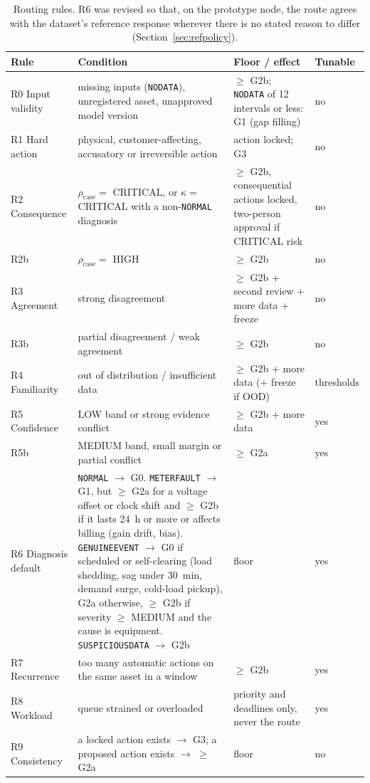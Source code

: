 \documentclass[11pt,a4paper]{article}
\renewcommand{\_}{\textunderscore\allowbreak}
\providecommand{\GE}{\texttt{GENUINE\_EVENT}}
\providecommand{\MF}{\texttt{METER\_FAULT}}
\providecommand{\SD}{\texttt{SUSPICIOUS\_DATA}}
\providecommand{\ND}{\texttt{NO\_DATA}}
\providecommand{\NORM}{\texttt{NORMAL}}
\newcommand{\lvl}[1]{\textsf{#1}}
\begin{document}
\begin{table}[H]
\centering\small
\footnotesize
\begin{tabularx}{\textwidth}{@{}>{\raggedright\arraybackslash}p{1.9cm}LL>{\raggedright\arraybackslash}p{1.5cm}@{}}
\toprule
\textbf{Rule} & \textbf{Condition} & \textbf{Floor / effect} & \textbf{Tunable} \\
\midrule
R0 Input validity & missing inputs (\ND), unregistered asset, unapproved model version & $\ge$ \lvl{G2b}; \ND{} of 12 intervals or less: \lvl{G1} (gap filling) & no \\
R1 Hard action & physical, customer-affecting, accusatory or irreversible action & action locked; \lvl{G3} & no \\
R2 Consequence & $\rho_{\mathrm{case}}=$ CRITICAL, or $\kappa=$ CRITICAL with a non-\NORM{} diagnosis & $\ge$ \lvl{G2b}, consequential actions locked, two-person approval if CRITICAL risk & no \\
R2b & $\rho_{\mathrm{case}}=$ HIGH & $\ge$ \lvl{G2b} & no \\
R3 Agreement & strong disagreement & $\ge$ \lvl{G2b} + second review + more data + freeze & no \\
R3b & partial disagreement / weak agreement & $\ge$ \lvl{G2b} & no \\
R4 Familiarity & out of distribution / insufficient data & $\ge$ \lvl{G2b} + more data (+ freeze if OOD) & thresholds \\
R5 Confidence & LOW band or strong evidence conflict & $\ge$ \lvl{G2b} + more data & yes \\
R5b & MEDIUM band, small margin or partial conflict & $\ge$ \lvl{G2a} & yes \\
R6 Diagnosis default & \NORM{} $\to$ \lvl{G0}. \MF{} $\to$ \lvl{G1}, but $\ge$ \lvl{G2a} for a voltage offset or clock shift and $\ge$ \lvl{G2b} if it lasts 24~h or more or affects billing (gain drift, bias). \GE{} $\to$ \lvl{G0} if scheduled or self-clearing (load shedding, sag under 30~min, demand surge, cold-load pickup), \lvl{G2a} otherwise, $\ge$ \lvl{G2b} if severity $\ge$ MEDIUM and the cause is equipment. \SD{} $\to$ \lvl{G2b} & floor & yes \\
R7 Recurrence & too many automatic actions on the same asset in a window & $\ge$ \lvl{G2b} & yes \\
R8 Workload & queue strained or overloaded & priority and deadlines only, never the route & yes \\
R9 Consistency & a locked action exists $\to$ \lvl{G3}; a proposed action exists $\to$ $\ge$ \lvl{G2a} & floor & no \\
\bottomrule
\end{tabularx}
\caption{Routing rules. R6 was revised so that, on the prototype node, the route agrees with the dataset's
reference response wherever there is no stated reason to differ (Section~\ref{sec:refpolicy}).}
\label{tab:rules}
\end{table}
\end{document}
